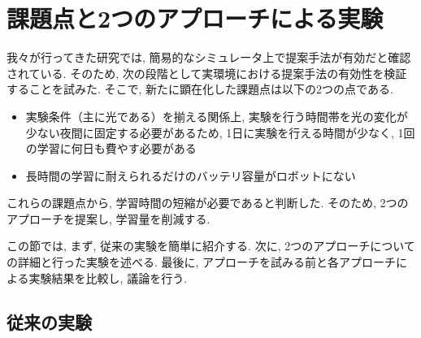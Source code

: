 
\section{課題点と2つのアプローチによる実験}
我々が行ってきた研究では, 簡易的なシミュレータ上で提案手法が有効だと確認されている. そのため, 次の段階として実環境における提案手法の有効性を検証することを試みた. そこで, 新たに顕在化した課題点は以下の2つの点である.

\begin{itemize}
  \item 実験条件（主に光である）を揃える関係上, 実験を行う時間帯を光の変化が少ない夜間に固定する必要があるため, 1日に実験を行える時間が少なく, 1回の学習に何日も費やす必要がある
  \item 長時間の学習に耐えられるだけのバッテリ容量がロボットにない
\end{itemize}

これらの課題点から, 学習時間の短縮が必要であると判断した. そのため, 2つのアプローチを提案し, 学習量を削減する.
\par
この節では, まず, 従来の実験を簡単に紹介する. 次に, 2つのアプローチについての詳細と行った実験を述べる. 最後に, アプローチを試みる前と各アプローチによる実験結果を比較し, 議論を行う.

\subsection{従来の実験}

